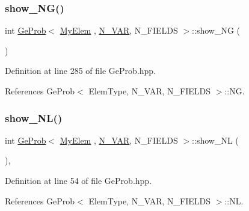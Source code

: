 \subsubsection{\texorpdfstring{show\+\_\+\+N\+G()}{show\_NG()}}
{\footnotesize\ttfamily int \hyperlink{classGeProb}{Ge\+Prob}$<$ \hyperlink{DG__Prob_8h_a83cd887ced9a6587428f267e50cd4787}{My\+Elem} , \hyperlink{classED__Prob_a4e7d2ff1a8e435e336fb00c527224b5a}{N\+\_\+\+V\+AR}, N\+\_\+\+F\+I\+E\+L\+DS $>$\+::show\+\_\+\+NG (\begin{DoxyParamCaption}{ }\end{DoxyParamCaption})\hspace{0.3cm}{\ttfamily [inherited]}}



Definition at line 285 of file Ge\+Prob.\+hpp.



References Ge\+Prob$<$ Elem\+Type, N\+\_\+\+V\+A\+R, N\+\_\+\+F\+I\+E\+L\+D\+S $>$\+::\+NG.

\mbox{\label{classGeProb_a6a4db729e1c6eab1165fb861b16649ac}} 
\subsubsection{\texorpdfstring{show\+\_\+\+N\+L()}{show\_NL()}}
{\footnotesize\ttfamily int \hyperlink{classGeProb}{Ge\+Prob}$<$ \hyperlink{DG__Prob_8h_a83cd887ced9a6587428f267e50cd4787}{My\+Elem} , \hyperlink{classED__Prob_a4e7d2ff1a8e435e336fb00c527224b5a}{N\+\_\+\+V\+AR}, N\+\_\+\+F\+I\+E\+L\+DS $>$\+::show\+\_\+\+NL (\begin{DoxyParamCaption}{ }\end{DoxyParamCaption})\hspace{0.3cm}{\ttfamily [inline]}, {\ttfamily [inherited]}}



Definition at line 54 of file Ge\+Prob.\+hpp.



References Ge\+Prob$<$ Elem\+Type, N\+\_\+\+V\+A\+R, N\+\_\+\+F\+I\+E\+L\+D\+S $>$\+::\+NL.

\mbox{\label{classGeProb_a95d6202865332fd522738383003d7b25}} 

